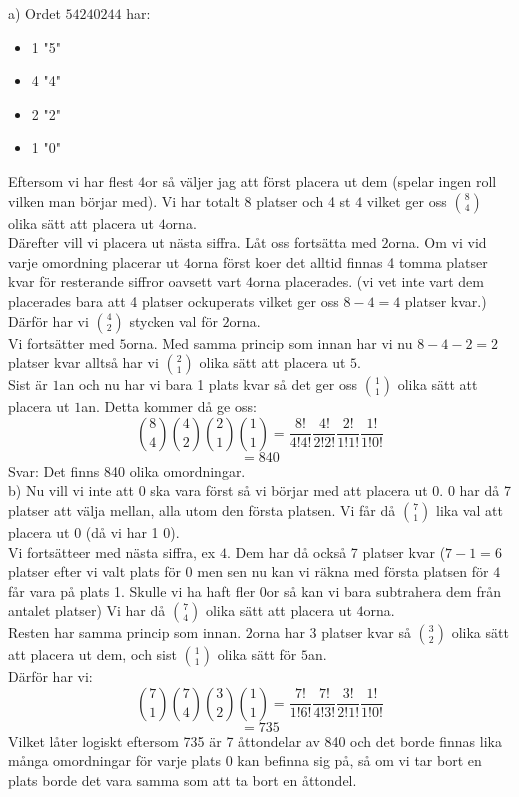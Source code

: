 \documentclass[nobib]{tufte-handout}
\begin{document}
\begin{xca}
a) Ordet $54240244$ har:
\begin{itemize}
  \item 1 "5"
  \item 4 "4"
  \item 2 "2"
  \item 1 "0"
\end{itemize}
Eftersom vi har flest $4$or så väljer jag att först placera ut dem (spelar ingen roll vilken man börjar med). Vi har totalt 8 platser och 4 st $4$ vilket ger oss $\binom{8}{4}$ olika sätt att placera ut $4$orna.\\
Därefter vill vi placera ut nästa siffra. Låt oss fortsätta med $2$orna. Om vi vid varje omordning placerar ut $4$orna först koer det alltid finnas 4 tomma platser kvar för resterande siffror oavsett vart $4$orna placerades. (vi vet inte vart dem placerades bara att 4 platser ockuperats vilket ger oss $8-4=4$ platser kvar.) Därför har vi $\binom{4}{2}$ stycken val för $2$orna.\\
Vi fortsätter med $5$orna. Med samma princip som innan har vi nu $8-4-2=2$ platser kvar alltså har vi $\binom{2}{1}$ olika sätt att placera ut $5$.\\
Sist är $1$an och nu har vi bara 1 plats kvar så det ger oss $\binom{1}{1}$ olika sätt att placera ut $1$an. Detta kommer då ge oss:
$$\binom{8}{4}\binom{4}{2}\binom{2}{1}\binom{1}{1}=\frac{8!}{4!4!}\frac{4!}{2!2!}\frac{2!}{1!1!}\frac{1!}{1!0!}$$
$$=840$$
Svar: Det finns 840 olika omordningar.\\
b) Nu vill vi inte att $0$ ska vara först så vi börjar med att placera ut $0$. $0$ har då 7 platser att välja mellan, alla utom den första platsen. Vi får då $\binom{7}{1}$ lika val att placera ut $0$ (då vi har 1 $0$).\\
Vi fortsätteer med nästa siffra, ex $4$. Dem har då också 7 platser kvar ($7-1=6$ platser efter vi valt plats för $0$ men sen nu kan vi räkna med första platsen för $4$ får vara på plats 1. Skulle vi ha haft fler $0$or så kan vi bara subtrahera dem från antalet platser) Vi har  då $\binom{7}{4}$ olika sätt att placera ut $4$orna.\\
Resten har samma princip som innan. $2$orna har 3 platser kvar så $\binom{3}{2}$ olika sätt att placera ut dem, och sist $\binom{1}{1}$ olika sätt för $5$an.\\
Därför har vi:
$$\binom{7}{1}\binom{7}{4}\binom{3}{2}\binom{1}{1}=\frac{7!}{1!6!}\frac{7!}{4!3!}\frac{3!}{2!1!}\frac{1!}{1!0!}$$
$$=735$$
Vilket låter logiskt eftersom 735 är 7 åttondelar av 840 och det borde finnas lika många omordningar för varje plats 0 kan befinna sig på, så om vi tar bort en plats borde det vara samma som att ta bort en åttondel.
\end{xca}
\end{document}
